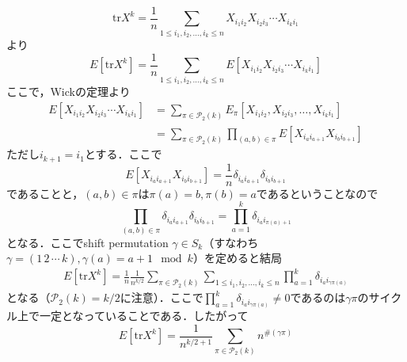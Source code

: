 \documentclass{ltjsarticle}
\makeatletter
\theoremstyle{mystyle1}
\theoremstyle{mystyle2}
\theoremstyle{mystyle3}
\renewenvironment{proof}[1][\proofname]{\par
  \pushQED{\qed}%
  \normalfont
  \topsep6\p@\@plus6\p@ \trivlist
  \item[\hskip\labelsep{\bfseries\sffamily #1}]\ignorespaces
}{%
  \popQED\endtrivlist\@endpefalse
}
\renewcommand\proofname{証明}
\makeatother
\begin{document}
\begin{proof}
    \begin{equation}
        \mathrm{tr}X^k=\frac{1}{n}\sum_{1\leq i_1,i_2,\ldots,i_k\leq n}X_{i_1i_2}X_{i_2i_3}\cdots X_{i_ki_1}
    \end{equation}
    より
    \begin{equation}
        E[\mathrm{tr}X^k]=\frac{1}{n}\sum_{1\leq i_1,i_2,\ldots,i_k\leq n}E[X_{i_1i_2}X_{i_2i_3}\cdots X_{i_ki_1}]
    \end{equation}
    ここで，Wickの定理より
    \begin{equation}
        \begin{split}
            E[X_{i_1i_2}X_{i_2i_3}\cdots X_{i_ki_1}]
            & =\sum_{\pi\in\mathcal{P}_2(k)}E_\pi[X_{i_1i_2},X_{i_2i_3},\ldots, X_{i_ki_1}]    \\
            & =\sum_{\pi\in\mathcal{P}_2(k)}\prod_{(a,b)\in\pi}E[X_{i_ai_{a+1}}X_{i_bi_{b+1}}]
        \end{split}
    \end{equation}
    ただし$i_{k+1}=i_1$とする．ここで
    \begin{equation}
        E[X_{i_ai_{a+1}}X_{i_bi_{b+1}}]=\frac{1}{n}\delta_{i_ai_{a+1}}\delta_{i_bi_{b+1}}
    \end{equation}
    であることと，$(a,b)\in\pi$は$\pi(a)=b,\pi(b)=a$であるということなので
    \begin{equation}
        \prod_{(a,b)\in\pi}\delta_{i_ai_{a+1}}\delta_{i_bi_{b+1}}=\prod_{a=1}^k\delta_{i_ai_{\pi(a)+1}}
    \end{equation}
    となる．ここでshift permutation $\gamma\in S_k$（すなわち$\gamma=(1\,2\,\cdots\,k),\gamma(a)=a+1\mod k$）を定めると結局
    \begin{equation}
        \begin{split}
            E[\mathrm{tr}X^k]=\frac{1}{n}\frac{1}{n^{k/2}}\sum_{\pi\in\mathcal{P}_2(k)}\sum_{1\leq i_1,i_2,\ldots,i_k\leq n}\prod_{a=1}^k\delta_{i_ai_{\gamma\pi(a)}}
        \end{split}
    \end{equation}
    となる（$\mathcal{P}_2(k)=k/2$に注意）．ここで$\prod_{a=1}^k\delta_{i_ai_{\gamma\pi(a)}}\neq 0$であるのは$\gamma\pi$のサイクル上で一定となっていることである．したがって%
    \begin{equation}
        E[\mathrm{tr}X^k]=\frac{1}{n^{k/2+1}}\sum_{\pi\in\mathcal{P}_2(k)}n^{\#(\gamma\pi)}
    \end{equation}
\end{proof}
\end{document}
